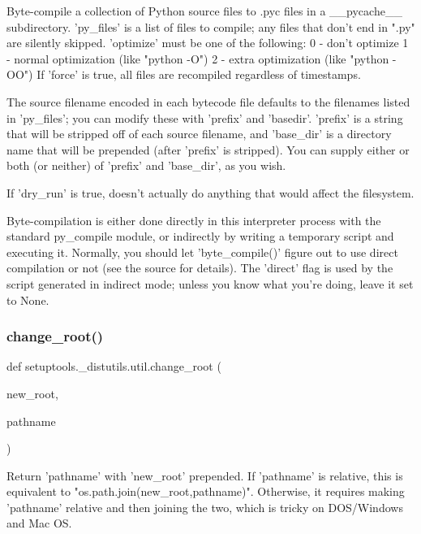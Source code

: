 \begin{DoxyVerb}Byte-compile a collection of Python source files to .pyc
files in a __pycache__ subdirectory.  'py_files' is a list
of files to compile; any files that don't end in ".py" are silently
skipped.  'optimize' must be one of the following:
  0 - don't optimize
  1 - normal optimization (like "python -O")
  2 - extra optimization (like "python -OO")
If 'force' is true, all files are recompiled regardless of
timestamps.

The source filename encoded in each bytecode file defaults to the
filenames listed in 'py_files'; you can modify these with 'prefix' and
'basedir'.  'prefix' is a string that will be stripped off of each
source filename, and 'base_dir' is a directory name that will be
prepended (after 'prefix' is stripped).  You can supply either or both
(or neither) of 'prefix' and 'base_dir', as you wish.

If 'dry_run' is true, doesn't actually do anything that would
affect the filesystem.

Byte-compilation is either done directly in this interpreter process
with the standard py_compile module, or indirectly by writing a
temporary script and executing it.  Normally, you should let
'byte_compile()' figure out to use direct compilation or not (see
the source for details).  The 'direct' flag is used by the script
generated in indirect mode; unless you know what you're doing, leave
it set to None.
\end{DoxyVerb}
 \mbox{\label{namespacesetuptools_1_1__distutils_1_1util_a6c74fa3bce071280e5e49478ace9d259}} 
\subsubsection{\texorpdfstring{change\+\_\+root()}{change\_root()}}
{\footnotesize\ttfamily def setuptools.\+\_\+distutils.\+util.\+change\+\_\+root (\begin{DoxyParamCaption}\item[{}]{new\+\_\+root,  }\item[{}]{pathname }\end{DoxyParamCaption})}

\begin{DoxyVerb}Return 'pathname' with 'new_root' prepended.  If 'pathname' is
relative, this is equivalent to "os.path.join(new_root,pathname)".
Otherwise, it requires making 'pathname' relative and then joining the
two, which is tricky on DOS/Windows and Mac OS.
\end{DoxyVerb}
 \mbox{\label{namespacesetuptools_1_1__distutils_1_1util_a5f3b3b53d1c2e1586a5a23e30f5929b3}} 
